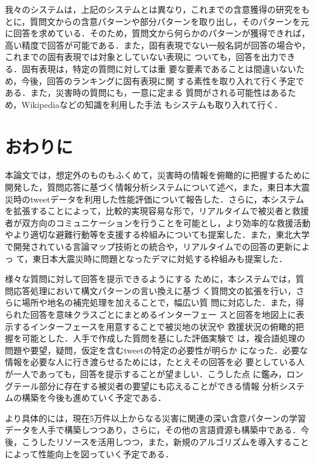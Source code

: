 \documentclass[japanese]{jnlp_1.4}
\begin{document}
我々のシステムは，上記のシステムとは異なり，これまでの含意獲得の研究をも
とに，質問文からの含意パターンや部分パターンを取り出し，そのパターンを元
に回答を求めている．そのため，質問文から何らかのパターンが獲得できれば，
高い精度で回答が可能である．また，固有表現でない一般名詞が回答の場合や，
これまでの固有表現\cite{Sekine2000,Sekine2008}では対象としていない表現に
ついても，回答を出力できる．固有表現は，特定の質問に対しては重
要な要素であることは間違いないため，今後，回答のランキングに固有表現に関
する素性を取り入れて行く予定である．また，災害時の質問にも，一意に定まる
質問がされる可能性はあるため，Wikipediaなどの知識を利用した手法
\cite{Buscaldi2006}もシステムも取り入れて行く．


\section{おわりに}
\label{Conclusion}

本論文では，想定外のものもふくめて，災害時の情報を俯瞰的に把握するために
開発した，質問応答に基づく情報分析システムについて述べ，また，東日本大震
災時のtweetデータを利用した性能評価について報告した．さらに，本システム
を拡張することによって，比較的実現容易な形で，リアルタイムで被災者と救援
者が双方向のコミュニケーションを行うことを可能とし，より効率的な救援活動
やより適切な避難行動等を支援する枠組みについても提案した．また，東北大学
で開発されている言論マップ技術との統合や，リアルタイムでの回答の更新によっ
て，東日本大震災時に問題となったデマに対処する枠組みも提案した．
 
様々な質問に対して回答を提示できるようにする
ために，本システムでは，質問応答処理において構文パターンの言い換えに基づ
く質問文の拡張を行い，さらに場所や地名の補完処理を加えることで，幅広い質
問に対応した．また，得られた回答を意味クラスごとにまとめるインターフェー
スと回答を地図上に表示するインターフェースを用意することで被災地の状況や
救援状況の俯瞰的把握を可能とした．人手で作成した質問を基にした評価実験で
は，複合語処理の問題や要望，疑問，仮定を含むtweetの特定の必要性が明らか
になった．必要な情報を必要な人に行き渡らせるためには，たとえその回答を必
要としている人が一人であっても，回答を提示することが望ましい．こうした点
に鑑み，ロングテール部分に存在する被災者の要望にも応えることができる情報
分析システムの構築を今後も進めていく予定である．

より具体的には，現在5万件以上からなる災害に関連の深い含意パターンの学習
データを人手で構築しつつあり，さらに，その他の言語資源も構築中である．今
後，こうしたリソースを活用しつつ，また，新規のアルゴリズムを導入すること
によって性能向上を図っていく予定である．
\end{document}

